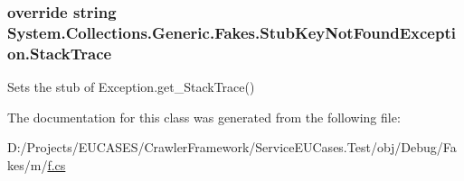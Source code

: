 \hypertarget{class_system_1_1_collections_1_1_generic_1_1_fakes_1_1_stub_key_not_found_exception_a30d4a1b77e3f752b1452dc2ee6d33fce}{
\subsubsection[{Stack\-Trace}]{\setlength{\rightskip}{0pt plus 5cm}override string System.\-Collections.\-Generic.\-Fakes.\-Stub\-Key\-Not\-Found\-Exception.\-Stack\-Trace\hspace{0.3cm}{\ttfamily [get]}}}\label{class_system_1_1_collections_1_1_generic_1_1_fakes_1_1_stub_key_not_found_exception_a30d4a1b77e3f752b1452dc2ee6d33fce}


Sets the stub of Exception.\-get\-\_\-\-Stack\-Trace()



The documentation for this class was generated from the following file\-:\begin{DoxyCompactItemize}
\item 
D\-:/\-Projects/\-E\-U\-C\-A\-S\-E\-S/\-Crawler\-Framework/\-Service\-E\-U\-Cases.\-Test/obj/\-Debug/\-Fakes/m/\hyperlink{m_2f_8cs}{f.\-cs}\end{DoxyCompactItemize}
